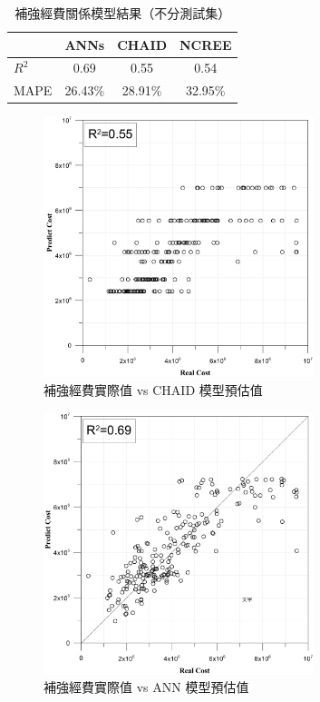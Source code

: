 {\renewcommand{\arraystretch}{1.5}
\begin{table}[hbtp]
  \begin{center}
    \caption{補強經費關係模型結果（不分測試集）}
    \label{tab:cost_result_2}
    \large
    \begin{tabular}{l c c c}
      \hline
       & ANNs & CHAID & NCREE \\
      \hline
     $R^2$ & 0.69 & 0.55 & 0.54 \\
     MAPE & 26.43\% & 28.91\% & 32.95\% \\
      \hline
      \end{tabular}
  \end{center}
\end{table}
}

\begin{figure}[hbtp]
  \begin{center}
    \includegraphics[width=0.7\textwidth]{figures/cob-chaid.pdf}
    \caption{補強經費實際值 vs CHAID 模型預估值} 
    \label{fig:cob-chaid-vs}
  \end{center}
\end{figure}


\begin{figure}[hbtp]
  \begin{center}
    \includegraphics[width=0.7\textwidth]{figures/cob-ann.pdf}
    \caption{補強經費實際值 vs ANN 模型預估值} 
    \label{fig:cob-ann-vs}
  \end{center}
\end{figure}

